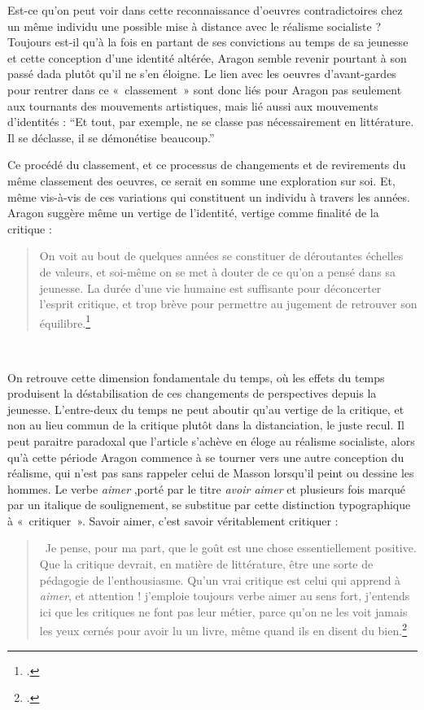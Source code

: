 	Est-ce qu’on peut voir dans cette reconnaissance d’oeuvres contradictoires chez un même individu une possible mise à distance avec le réalisme socialiste ? Toujours est-il qu’à la fois en partant de ses convictions au temps de sa jeunesse et cette conception d’une identité altérée, Aragon semble revenir pourtant à son passé dada plutôt qu’il ne s’en éloigne. Le lien avec les oeuvres d’avant-gardes pour rentrer dans ce « classement » sont donc liés pour Aragon pas seulement aux tournants des mouvements artistiques, mais lié aussi aux mouvements d’identités : \enquote{Et tout, par exemple, ne se classe pas nécessairement en littérature. Il se déclasse, il se démonétise beaucoup.}

Ce procédé du classement, et ce processus de changements et de revirements du même classement des oeuvres, ce serait en somme une exploration sur soi. Et, même vis-à-vis de ces variations qui constituent un individu à travers les années. Aragon suggère même un vertige de l’identité, vertige comme finalité de la critique : 

\begin{quote}
 On voit au bout de quelques années se constituer de déroutantes échelles de valeurs, et soi-même on se met à douter de ce qu’on a pensé dans sa jeunesse. La durée d’une vie humaine est suffisante pour déconcerter l’esprit critique, et trop brève pour permettre au jugement de retrouver son équilibre.\footcite{savoiraimer}   
\end{quote}
 

	 On retrouve cette dimension fondamentale du temps, où les effets du temps produisent la déstabilisation de ces changements de perspectives depuis la jeunesse. L’entre-deux du temps ne peut aboutir qu’au vertige de la critique, et non au lieu commun de la critique plutôt dans la distanciation, le juste recul. Il peut paraitre paradoxal que l’article s’achève en éloge au réalisme socialiste, alors qu’à cette période Aragon commence à se tourner vers une autre conception du réalisme, qui n’est pas sans rappeler celui de Masson lorsqu’il peint ou dessine les hommes. Le verbe \emph{aimer} ,porté par le titre \emph{avoir aimer} et plusieurs fois marqué par un italique de soulignement, se substitue par cette distinction typographique à « critiquer ». Savoir aimer, c’est savoir véritablement critiquer :  

     \begin{quote}
       Je pense, pour ma part, que le goût est une chose essentiellement positive. Que la critique devrait, en matière de littérature, être une sorte de pédagogie de l’enthousiasme. Qu’un vrai critique est celui qui apprend à \emph{aimer}, et attention ! j’emploie toujours verbe aimer au sens fort, j’entends ici que les critiques ne font pas leur métier, parce qu’on ne les voit jamais les yeux cernés pour avoir lu un livre, même quand ils en disent du bien.\footcite{atraversgaleries}    
     \end{quote}


